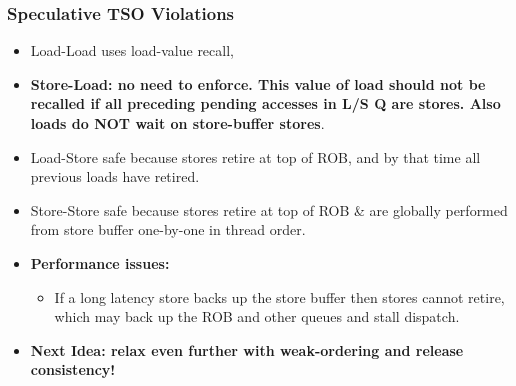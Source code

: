\documentclass{beamer}
\newcommand{\emphh}[1]{\textcolor{CosGreen}{ #1}}
\begin{document}
\begin{frame}[fragile,t]
\frametitle{Speculative TSO Violations}

\begin{itemize}
\item Load-Load uses load-value recall,\medskip
\item \emphh{\bf Store-Load: no need to enforce. This value of load 
            should not be recalled if all preceding pending
            accesses in L/S Q are stores. Also loads do NOT wait on
            store-buffer stores}.\medskip
\item Load-Store safe because stores retire at top of ROB,
            and by that time all previous loads have retired.\medskip
\item Store-Store safe because stores retire at top of ROB \&
            are globally performed from store buffer one-by-one
            in thread order.\bigskip
\item \alert{\bf Performance issues:}
    \begin{itemize}
        \item If a long latency store backs up the store buffer
                then stores cannot retire, which may back up the ROB
                and other queues and stall dispatch.
    \end{itemize}\medskip
\item \emphh{\bf Next Idea: relax even further with weak-ordering and release consistency!}
\end{itemize}

\end{frame}
\end{document}
